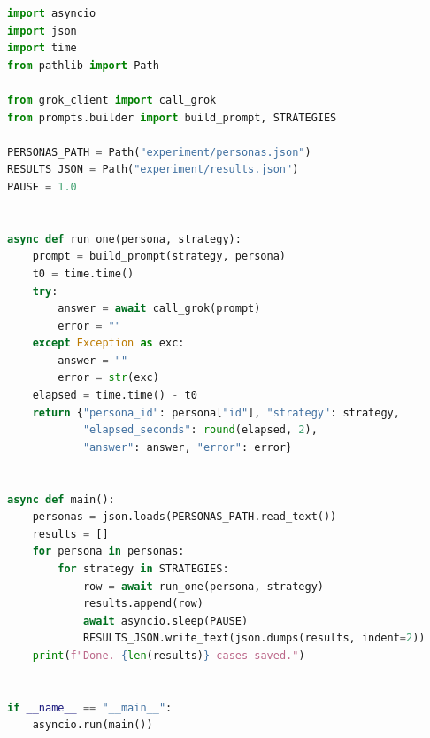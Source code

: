 \begin{lstlisting}[language=Python, caption={Experiment runner: 30 personas $\times$ 4 strategies.}, label={lst:app-exp}]
import asyncio
import json
import time
from pathlib import Path

from grok_client import call_grok
from prompts.builder import build_prompt, STRATEGIES

PERSONAS_PATH = Path("experiment/personas.json")
RESULTS_JSON = Path("experiment/results.json")
PAUSE = 1.0


async def run_one(persona, strategy):
    prompt = build_prompt(strategy, persona)
    t0 = time.time()
    try:
        answer = await call_grok(prompt)
        error = ""
    except Exception as exc:
        answer = ""
        error = str(exc)
    elapsed = time.time() - t0
    return {"persona_id": persona["id"], "strategy": strategy,
            "elapsed_seconds": round(elapsed, 2),
            "answer": answer, "error": error}


async def main():
    personas = json.loads(PERSONAS_PATH.read_text())
    results = []
    for persona in personas:
        for strategy in STRATEGIES:
            row = await run_one(persona, strategy)
            results.append(row)
            await asyncio.sleep(PAUSE)
            RESULTS_JSON.write_text(json.dumps(results, indent=2))
    print(f"Done. {len(results)} cases saved.")


if __name__ == "__main__":
    asyncio.run(main())
\end{lstlisting}
